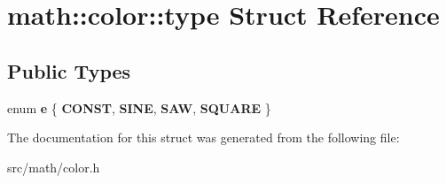 \hypertarget{structmath_1_1color_1_1type}{
\section{math::color::type Struct Reference}
\label{structmath_1_1color_1_1type}
}
\subsection*{Public Types}
\begin{DoxyCompactItemize}
\item 
enum {\bfseries e} \{ {\bfseries CONST}, 
{\bfseries SINE}, 
{\bfseries SAW}, 
{\bfseries SQUARE}
 \}
\end{DoxyCompactItemize}


The documentation for this struct was generated from the following file:\begin{DoxyCompactItemize}
\item 
src/math/color.h\end{DoxyCompactItemize}

